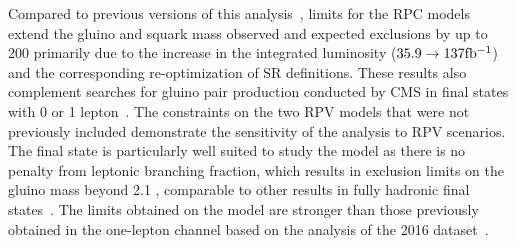

Compared to previous versions of this
analysis~\cite{CMS:mySUS2016,CMS:SUS16041}, limits for the RPC models extend
the gluino and squark mass observed and expected exclusions by up to 200\GeV
primarily due to the increase in the integrated luminosity
($35.9\rightarrow\mathrm{137{fb}{}^{-1}}$) and the corresponding re-optimization of
SR definitions. These results also complement searches for gluino pair
production conducted by CMS in final states with 0 or 1
lepton~\cite{CMS:2019tlp,CMS:Sirunyan2019ctn,CMS:Sirunyan2019xwh}. The
constraints on the two RPV models that were not previously included
demonstrate the sensitivity of the analysis to RPV scenarios. The final state
is particularly well suited to study the \ToqqqqL model as there is no
penalty from leptonic branching fraction, which results in exclusion limits
on the gluino mass beyond 2.1 \TeV, comparable to other results in fully
hadronic final states~\cite{CMS:Sirunyan2019ctn,CMS:Sirunyan2019xwh}. The
limits obtained on the \Totbs model are stronger than those previously
obtained in the one-lepton channel based on the analysis of the 2016
dataset~\cite{CMS:Sirunyan2017dhe}.

